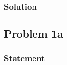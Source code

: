 \documentclass[conf]{new-aiaa}
\begin{document}
\subsubsection*{Solution} 

%
%



\subsection*{Problem 1a} 

\subsubsection*{Statement} 
\begin{center}
	 \\
\end{center}
\end{document}
